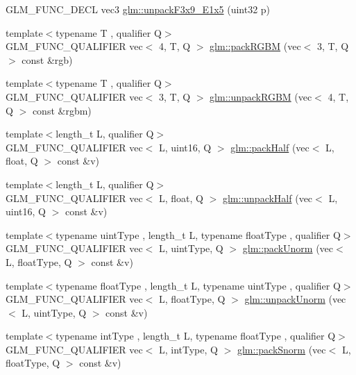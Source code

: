 \begin{DoxyCompactItemize}
\item 
G\+L\+M\+\_\+\+F\+U\+N\+C\+\_\+\+D\+E\+CL vec3 \hyperlink{group__gtc__packing_ga15d8845a31e1e55d493803d0c8cb5910}{glm\+::unpack\+F3x9\+\_\+\+E1x5} (uint32 p)
\item 
{\footnotesize template$<$typename T , qualifier Q$>$ }\\G\+L\+M\+\_\+\+F\+U\+N\+C\+\_\+\+Q\+U\+A\+L\+I\+F\+I\+ER vec$<$ 4, T, Q $>$ \hyperlink{group__gtc__packing_ga0466daf4c90f76cc64b3f105ce727295}{glm\+::pack\+R\+G\+BM} (vec$<$ 3, T, Q $>$ const \&rgb)
\item 
{\footnotesize template$<$typename T , qualifier Q$>$ }\\G\+L\+M\+\_\+\+F\+U\+N\+C\+\_\+\+Q\+U\+A\+L\+I\+F\+I\+ER vec$<$ 3, T, Q $>$ \hyperlink{group__gtc__packing_ga5c1ec97894b05ea21a05aea4f0204a02}{glm\+::unpack\+R\+G\+BM} (vec$<$ 4, T, Q $>$ const \&rgbm)
\item 
{\footnotesize template$<$length\+\_\+t L, qualifier Q$>$ }\\G\+L\+M\+\_\+\+F\+U\+N\+C\+\_\+\+Q\+U\+A\+L\+I\+F\+I\+ER vec$<$ L, uint16, Q $>$ \hyperlink{group__gtc__packing_ga2d8bbce673ebc04831c1fb05c47f5251}{glm\+::pack\+Half} (vec$<$ L, float, Q $>$ const \&v)
\item 
{\footnotesize template$<$length\+\_\+t L, qualifier Q$>$ }\\G\+L\+M\+\_\+\+F\+U\+N\+C\+\_\+\+Q\+U\+A\+L\+I\+F\+I\+ER vec$<$ L, float, Q $>$ \hyperlink{group__gtc__packing_ga30d6b2f1806315bcd6047131f547d33b}{glm\+::unpack\+Half} (vec$<$ L, uint16, Q $>$ const \&v)
\item 
{\footnotesize template$<$typename uint\+Type , length\+\_\+t L, typename float\+Type , qualifier Q$>$ }\\G\+L\+M\+\_\+\+F\+U\+N\+C\+\_\+\+Q\+U\+A\+L\+I\+F\+I\+ER vec$<$ L, uint\+Type, Q $>$ \hyperlink{group__gtc__packing_gaccd3f27e6ba5163eb7aa9bc8ff96251a}{glm\+::pack\+Unorm} (vec$<$ L, float\+Type, Q $>$ const \&v)
\item 
{\footnotesize template$<$typename float\+Type , length\+\_\+t L, typename uint\+Type , qualifier Q$>$ }\\G\+L\+M\+\_\+\+F\+U\+N\+C\+\_\+\+Q\+U\+A\+L\+I\+F\+I\+ER vec$<$ L, float\+Type, Q $>$ \hyperlink{group__gtc__packing_ga3e6ac9178b59f0b1b2f7599f2183eb7f}{glm\+::unpack\+Unorm} (vec$<$ L, uint\+Type, Q $>$ const \&v)
\item 
{\footnotesize template$<$typename int\+Type , length\+\_\+t L, typename float\+Type , qualifier Q$>$ }\\G\+L\+M\+\_\+\+F\+U\+N\+C\+\_\+\+Q\+U\+A\+L\+I\+F\+I\+ER vec$<$ L, int\+Type, Q $>$ \hyperlink{group__gtc__packing_gaa54b5855a750d6aeb12c1c902f5939b8}{glm\+::pack\+Snorm} (vec$<$ L, float\+Type, Q $>$ const \&v)

\end{DoxyCompactItemize}
